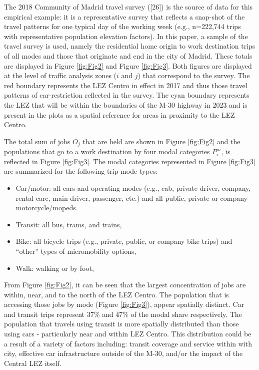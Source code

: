 \documentclass[10pt,letterpaper]{article}
\providecommand{\tightlist}{%
  \setlength{\itemsep}{0pt}\setlength{\parskip}{0pt}}
\begin{document}
The 2018 Community of Madrid travel survey ({[}26{]}) is the source of
data for this empirical example: it is a representative survey that
reflects a snap-shot of the travel patterns for one typical day of the
working week (e.g., n=222,744 trips with representative population
elevation factors). In this paper, a sample of the travel survey is
used, namely the residential home origin to work destination trips of
all modes and those that originate and end in the city of Madrid. These
totals are displayed in Figure \ref{fig:Fig2} and Figure \ref{fig:Fig3}.
Both figures are displayed at the level of traffic analysis zones (\(i\)
and \(j\)) that correspond to the survey. The red boundary represents
the LEZ Centro in effect in 2017 and thus those travel patterns of
car-restriction reflected in the survey. The cyan boundary represents
the LEZ that will be within the boundaries of the M-30 highway in 2023
and is present in the plots as a spatial reference for areas in
proximity to the LEZ Centro.

The total sum of jobs \(O_j\) that are held are shown in Figure
\ref{fig:Fig2} and the populations that go to a work destination by four
modal categories \(P^m_i\), is reflected in Figure \ref{fig:Fig3}. The
modal categories represented in Figure \ref{fig:Fig3} are summarized for
the following trip mode types:

\begin{itemize}
\tightlist
\item
  Car/motor: all cars and operating modes (e.g., cab, private driver,
  company, rental care, main driver, passenger, etc.) and all public,
  private or company motorcycle/mopeds.
\item
  Transit: all bus, trams, and trains,
\item
  Bike: all bicycle trips (e.g., private, public, or company bike trips)
  and ``other'' types of micromobility options,
\item
  Walk: walking or by foot,
\end{itemize}

From Figure \ref{fig:Fig2}, it can be seen that the largest
concentration of jobs are within, near, and to the north of the LEZ
Centro. The population that is accessing those jobs by mode (Figure
\ref{fig:Fig3}), appear spatially distinct. Car and transit trips
represent 37\% and 47\% of the modal share respectively. The population
that travels using transit is more spatially distributed than those
using cars - particularly near and within LEZ Centro. This distribution
could be a result of a variety of factors including: transit coverage
and service within with city, effective car infrastructure outside of
the M-30, and/or the impact of the Central LEZ itself.
\end{document}
